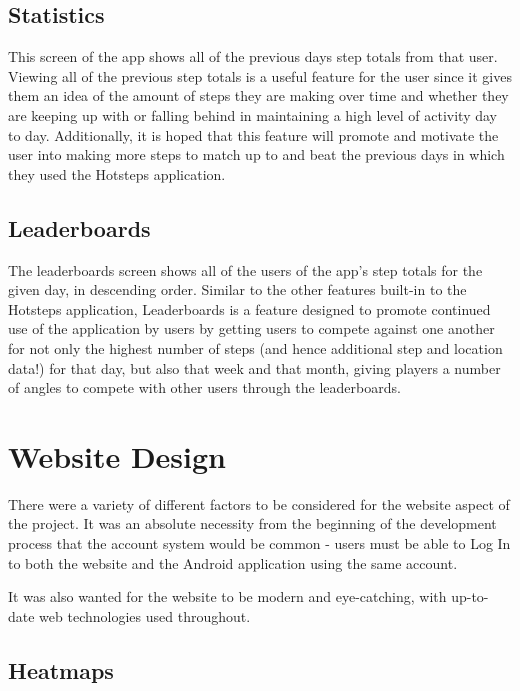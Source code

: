 \documentclass{l4proj}
\begin{document}
\subsection{Statistics}

This screen of the app shows all of the previous days step totals from that user. Viewing all of the previous step totals is a useful feature for the user since it gives them an idea of the amount of steps they are making over time and whether they are keeping up with or falling behind in maintaining a high level of activity day to day. Additionally, it is hoped that this feature will promote and motivate the user into making more steps to match up to and beat the previous days in which they used the Hotsteps application.

\subsection{Leaderboards}

The leaderboards screen shows all of the users of the app's step totals for the given day, in descending order. Similar to the other features built-in to the Hotsteps application, Leaderboards is a feature designed to promote continued use of the application by users by getting users to compete against one another for not only the highest number of steps (and hence additional step and location data!) for that day, but also that week and that month, giving players a number of angles to compete with other users through the leaderboards.

\section{Website Design}

There were a variety of different factors to be considered for the website aspect of the project. It was an absolute necessity from the beginning of the development process that the account system would be common - users must be able to Log In to both the website and the Android application using the same account.

It was also wanted for the website to be modern and eye-catching, with up-to-date web technologies used throughout.

\subsection{Heatmaps}
\end{document}
